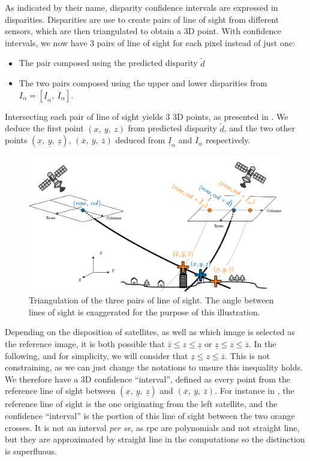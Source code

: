 As indicated by their name, disparity confidence intervals are expressed in disparities. Disparities are use to create pairs of line of sight from different sensors, which are then triangulated to obtain a 3D point. With confidence intervals, we now have 3 pairs of line of sight for each pixel instead of just one:
\begin{itemize}
    \item The pair composed using the predicted disparity $\tilde{d}$
    \item The two pairs composed using the upper and lower disparities from $I_\alpha=[\underline{I}_\alpha, ~\overline{I}_\alpha]$.
\end{itemize}
Intersecting each pair of line of sight yields $3$ 3D points, as presented in . We deduce the first point $(x, ~y, ~z)$ from predicted disparity $\tilde{d}$, and the two other points $(\underline{x}, ~\underline{y}, ~\underline{z})$, $(\overline{x}, ~\overline{y}, ~\overline{z})$ deduced from $\underline{I}_\alpha$ and $\overline{I}_\alpha$ respectively.
\begin{figure}
    \centering
    \includegraphics[width=\linewidth]{Images/Chap_5/Pairs_of_line_of_sight.png}
    \caption{Triangulation of the three pairs of line of sight. The angle between lines of sight is exaggerated for the purpose of this illustration.}
    \label{fig:pairs_of_line_of_sight}
\end{figure}

Depending on the disposition of satellites, as well as which image is selected as the reference image, it is both possible that $\overline{z}\leqslant z \leqslant \underline{z}$ or $\underline{z}\leqslant z \leqslant \overline{z}$. In the following, and for simplicity, we will consider that $\underline{z}\leqslant z \leqslant \overline{z}$. This is not constraining, as we can just change the notations to unsure this inequality holds. We therefore have a 3D confidence ``interval'', defined as every point from the reference line of sight between $(\underline{x}, ~\underline{y}, ~\underline{z})$ and $(\overline{x}, ~\overline{y}, ~\overline{z})$. For instance in , the reference line of sight is the one originating from the left satellite, and the confidence ``interval'' is the portion of this line of sight between the two orange crosses. It is not an interval \textit{per se}, as \acrshort{rpc} are polynomials and not straight line, but they are approximated by straight line in the computations so the distinction is superfluous. 

